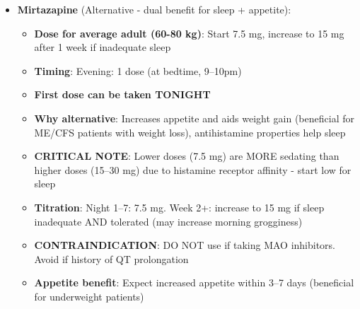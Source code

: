 \begin{enumerate}
\begin{itemize}
        \item \textbf{Mirtazapine} (Alternative - dual benefit for sleep + appetite):
        \begin{itemize}
            \item \textbf{Dose for average adult (60-80 kg)}: Start 7.5 mg, increase to 15 mg after 1 week if inadequate sleep
            \item \textbf{Timing}: Evening: 1 dose (at bedtime, 9--10pm)
            \item \textbf{First dose can be taken TONIGHT}
            \item \textbf{Why alternative}: Increases appetite and aids weight gain (beneficial for ME/CFS patients with weight loss), antihistamine properties help sleep
            \item \textbf{CRITICAL NOTE}: Lower doses (7.5 mg) are MORE sedating than higher doses (15--30 mg) due to histamine receptor affinity - start low for sleep
            \item \textbf{Titration}: Night 1--7: 7.5 mg. Week 2+: increase to 15 mg if sleep inadequate AND tolerated (may increase morning grogginess)
            \item \textbf{CONTRAINDICATION}: DO NOT use if taking MAO inhibitors. Avoid if history of QT prolongation
            \item \textbf{Appetite benefit}: Expect increased appetite within 3--7 days (beneficial for underweight patients)
        \end{itemize}


\end{itemize}
\end{enumerate}

